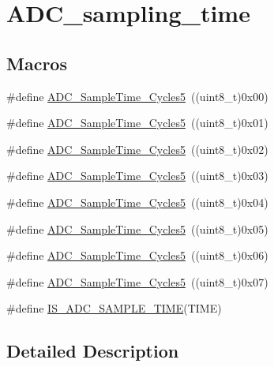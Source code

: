 \hypertarget{group___a_d_c__sampling__time}{}\section{A\+D\+C\+\_\+sampling\+\_\+time}
\label{group___a_d_c__sampling__time}
\subsection*{Macros}
\begin{DoxyCompactItemize}
\item 
\#define \mbox{\hyperlink{group___a_d_c__sampling__time_gad085065e48857ada890863a7db575c6e}{A\+D\+C\+\_\+\+Sample\+Time\+\_\+Cycles5}}~((uint8\+\_\+t)0x00)
\item 
\#define \mbox{\hyperlink{group___a_d_c__sampling__time_gac4101073619c4d79efa28a477696b3f5}{A\+D\+C\+\_\+\+Sample\+Time\+\_\+Cycles5}}~((uint8\+\_\+t)0x01)
\item 
\#define \mbox{\hyperlink{group___a_d_c__sampling__time_gaef37e223e826ac5e6ee5ef30881f9b27}{A\+D\+C\+\_\+\+Sample\+Time\+\_\+Cycles5}}~((uint8\+\_\+t)0x02)
\item 
\#define \mbox{\hyperlink{group___a_d_c__sampling__time_ga6251e64783f7a6562e17e71f7edd68d8}{A\+D\+C\+\_\+\+Sample\+Time\+\_\+Cycles5}}~((uint8\+\_\+t)0x03)
\item 
\#define \mbox{\hyperlink{group___a_d_c__sampling__time_gadc3d26f9bf5fa6589889cc938c66e0e7}{A\+D\+C\+\_\+\+Sample\+Time\+\_\+Cycles5}}~((uint8\+\_\+t)0x04)
\item 
\#define \mbox{\hyperlink{group___a_d_c__sampling__time_ga6a6fbbadc0e35a719fb749bf6b0704d6}{A\+D\+C\+\_\+\+Sample\+Time\+\_\+Cycles5}}~((uint8\+\_\+t)0x05)
\item 
\#define \mbox{\hyperlink{group___a_d_c__sampling__time_gae46e8978ac3160969156739ddb867dae}{A\+D\+C\+\_\+\+Sample\+Time\+\_\+Cycles5}}~((uint8\+\_\+t)0x06)
\item 
\#define \mbox{\hyperlink{group___a_d_c__sampling__time_ga93117dc4090dc4e3e84e0eef6d6ab073}{A\+D\+C\+\_\+\+Sample\+Time\+\_\+Cycles5}}~((uint8\+\_\+t)0x07)
\item 
\#define \mbox{\hyperlink{group___a_d_c__sampling__time_ga30e0307fa009e1c383d3047b48e94644}{I\+S\+\_\+\+A\+D\+C\+\_\+\+S\+A\+M\+P\+L\+E\+\_\+\+T\+I\+ME}}(T\+I\+ME)
\end{DoxyCompactItemize}


\subsection{Detailed Description}


